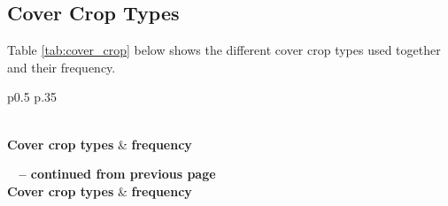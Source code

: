 \documentclass[review,12pt,authoryear]{elsarticle}
\begin{document}
\begin{linenumbers}
\begin{center}
\begin{longtable}{p{0.5\linewidth} p{.35\linewidth}}
  \end{longtable}
  \end{center}
  
  \clearpage
\subsection{Cover Crop Types}
Table \ref{tab:cover_crop} below shows the different cover crop types used together and their frequency.

\begin{center}
  \begin{longtable}{p{0.5\linewidth} p{.35\linewidth}}
    \caption{Frequency and class types of cover crop types used by vineyards.}\label{tab:cover_crop} \\
  
  \hline \textbf{Cover crop types} & \textbf{frequency}\\ \hline 
  \endfirsthead
  
  {{\bfseries \tablename\ \thetable{} -- continued from previous page}} \\
  \hline \textbf{Cover crop types} & \textbf{frequency} \\ \hline 
  \endhead
  
  \hline {} \\ \hline
  \endfoot
  
  \hline \hline
  \endlastfoot


\end{longtable}
\end{center}
\end{linenumbers}
\end{document}
